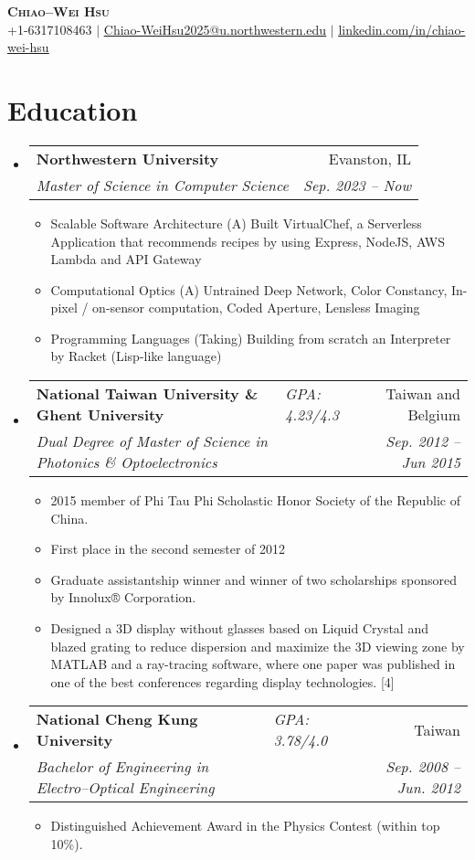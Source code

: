 \documentclass[letterpaper,11pt]{article}
\makeatletter
\newcommand{\resumeItem}[1]{
  \item\small{
    {#1 \vspace{-2pt}}
  }
}
\newcommand{\resumeSubheading}[4]{
  \vspace{-2pt}\item
    \begin{tabular*}{0.97\textwidth}[t]{l@{\extracolsep{\fill}}r}
      \textbf{#1} & #2 \\
      \textit{\small#3} & \textit{\small #4} \\
    \end{tabular*}\vspace{-7pt}
}
\newcommand{\resumeSubheadingII}[5]{
  \vspace{-2pt}\item
    \begin{tabular*}{0.97\textwidth}[t]{ll@{\extracolsep{\fill}}r}
      \textbf{#1} & \textit{\small#5} & #2 \\
      \textit{\small#3} & \textit{} & \textit{\small #4} \\
    \end{tabular*}\vspace{-7pt}
}
\newcommand{\resumeSubHeadingListStart}{\begin{itemize}[leftmargin=0.15in, label={}]}
\newcommand{\resumeSubHeadingListEnd}{\end{itemize}}
\newcommand{\resumeItemListStart}{\begin{itemize}}
\newcommand{\resumeItemListEnd}{\end{itemize}\vspace{-5pt}}
\makeatother
\begin{document}

\begin{center}
    \textbf{\Huge \scshape Chiao--Wei Hsu} \\ \vspace{1pt}
    \small +1-6317108463 $|$ \href{mailto:Chiao-WeiHsu2025@u.northwestern.edu}{\underline{Chiao-WeiHsu2025@u.northwestern.edu}} $|$ 
    \href{https://linkedin.com/in/chiao-wei-hsu}{\underline{linkedin.com/in/chiao-wei-hsu}}
\end{center}


\section{Education}
  \resumeSubHeadingListStart
    \resumeSubheading
      {Northwestern University}{Evanston, IL}
      {Master of Science in Computer Science}{Sep. 2023 -- Now}{}{}
      \resumeItemListStart
        \resumeItem{Scalable Software Architecture (A)}{Built VirtualChef, a Serverless Application that recommends recipes by using Express, NodeJS, AWS Lambda and API Gateway}
        \resumeItem{Computational Optics (A)}{Untrained Deep Network, Color Constancy, In-pixel / on-sensor computation, Coded Aperture, Lensless Imaging}
        \resumeItem{Programming Languages (Taking)}{Building from scratch an Interpreter by Racket (Lisp-like language)}
        \resumeItemListEnd
    \resumeSubheadingII
      {National Taiwan University \& Ghent University}{Taiwan and Belgium}
      {Dual Degree of Master of Science in Photonics \& Optoelectronics}{Sep. 2012 -- Jun 2015}{GPA: 4.23/4.3}
      \resumeItemListStart
        \resumeItem{2015 member of Phi Tau Phi Scholastic Honor Society of the Republic of China.}
        \resumeItem{First place in the second semester of 2012}
        \resumeItem {Graduate assistantship winner and winner of two scholarships sponsored by Innolux® Corporation.}
        \resumeItem {Designed a 3D display without glasses based on Liquid Crystal and blazed grating to reduce dispersion and maximize the 3D viewing zone by MATLAB and a ray-tracing software, where one paper was published in one of the best conferences regarding display technologies. [4]}
      \resumeItemListEnd
    \resumeSubheadingII
      {National Cheng Kung University}{Taiwan}{Bachelor of Engineering in Electro--Optical Engineering}{Sep. 2008 -- Jun. 2012}{GPA: 3.78/4.0}
      \resumeItemListStart
        \resumeItem{Distinguished Achievement Award in the Physics Contest (within top 10\%).}
      \resumeItemListEnd
  \resumeSubHeadingListEnd
\end{document}
